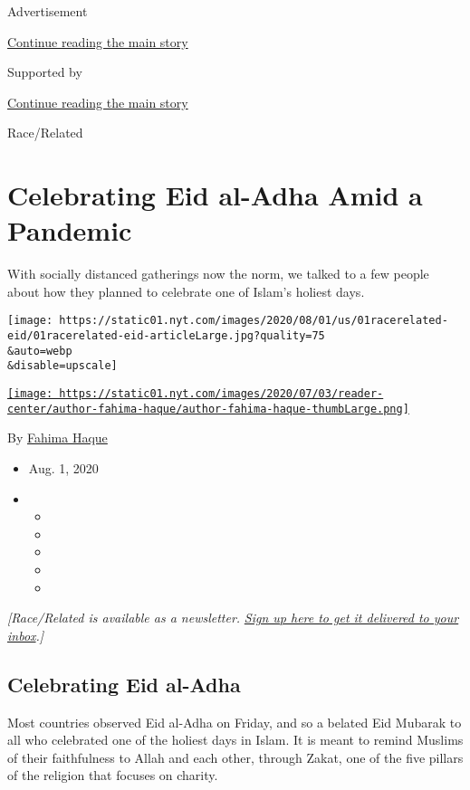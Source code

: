 Advertisement

\protect\hyperlink{after-top}{Continue reading the main story}

Supported by

\protect\hyperlink{after-sponsor}{Continue reading the main story}

Race/Related

\hypertarget{celebrating-eid-al-adha-amid-a-pandemic}{%
\section{Celebrating Eid al-Adha Amid a
Pandemic}\label{celebrating-eid-al-adha-amid-a-pandemic}}

With socially distanced gatherings now the norm, we talked to a few
people about how they planned to celebrate one of Islam's holiest days.

\texttt{[image: https://static01.nyt.com/images/2020/08/01/us/01racerelated-eid/01racerelated-eid-articleLarge.jpg?quality=75\\\&auto=webp\\\&disable=upscale]}

\href{https://www.nytimes.com/by/fahima-haque}{\texttt{[image: https://static01.nyt.com/images/2020/07/03/reader-center/author-fahima-haque/author-fahima-haque-thumbLarge.png]}}

By \href{https://www.nytimes.com/by/fahima-haque}{Fahima Haque}

\begin{itemize}
\item
  Aug. 1, 2020
\item
  \begin{itemize}
  \item
  \item
  \item
  \item
  \item
  \end{itemize}
\end{itemize}

\emph{{[}Race/Related is available as a newsletter.}
\href{https://www.nytimes.com/newsletters/race-related}{\emph{Sign up
here to get it delivered to your inbox}}\emph{.{]}}

\hypertarget{celebrating-eid-al-adha}{%
\subsection{Celebrating Eid al-Adha}\label{celebrating-eid-al-adha}}

Most countries observed Eid al-Adha on Friday, and so a belated Eid
Mubarak to all who celebrated one of the holiest days in Islam. It is
meant to remind Muslims of their faithfulness to Allah and each other,
through Zakat, one of the five pillars of the religion that focuses on
charity.

